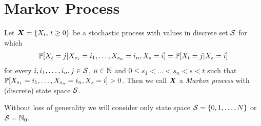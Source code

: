 \section{Markov Process}
\label{chap:basics}

\begin{definition}\label{markovChain}
	Let $\proc{X}$ be a stochastic process with values in discrete set $\S$ for which
	\begin{align}
		\pr [X_{t} = j \vert X_{s_1} = i_1 , \ldots  , X_{s_n} = i_n, X_{s} = i] = \pr [X_{t} = j \vert X_{s} = i]
	\label{markovProp}
	\end{align}
	for every $i , i_1 , \ldots  , i_n , j \in \S$, $n \in \N$ and $0 \leq s_1<\ldots  < s_n < s < t$ such that $\pr [X_{s_1} = i_1 , \ldots  , X_{s_n} = i_n, X_{s} = i] > 0$. Then we call $\m{X}$ a \emph{Markov process} with (discrete) state space $\S$.
\end{definition}

Without loss of generality we will consider only state space $\S = \{0 , 1 , \ldots  , N\}$ or $\S = \N_0$.


